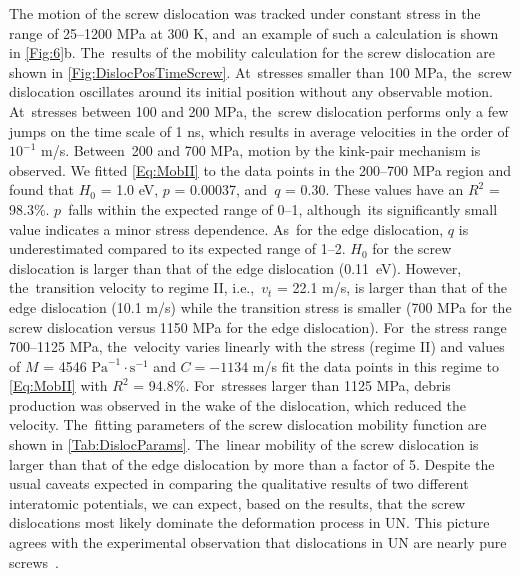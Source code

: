 \documentclass[applsci,article,accept,pdftex,moreauthors]{Definitions/mdpi}
\newcommand{\?}{\stackrel{?}{=}}
\begin{document}
The motion of the screw dislocation was tracked under constant stress in the range of 25--1200 MPa at 300 K, and~an example of such a calculation is shown in \cref{Fig:6}b. The~results of the mobility calculation for the screw dislocation are shown in \cref{Fig:DislocPosTimeScrew}. At~stresses smaller than 100 MPa, the~screw dislocation oscillates around its initial position without any observable motion. At~stresses between 100 and 200 MPa, the~screw dislocation performs only a few jumps on the time scale of 1 ns, which results in average velocities in the order of $10^{-1}$ m/s. Between~200 and 700 MPa, motion by the kink-pair mechanism is observed. We fitted \cref{Eq:MobII} to the data points in the 200--700 MPa region and found that $H_0$ = 1.0 eV, $p$ = 0.00037, and~$q$ = 0.30. These values have an $R^2$ = 98.3\%. $p$~falls within the expected range of 0--1, although~its significantly small value indicates a minor stress dependence. As~for the edge dislocation, $q$ is underestimated compared to its expected range of 1--2. $H_0$ for the screw dislocation is larger than that of the edge dislocation (0.11~eV). However, the~transition velocity to regime II, i.e.,~$v_t$ = 22.1 m/s, is larger than that of the edge dislocation (10.1 m/s) while the transition stress is smaller (700 MPa for the screw dislocation versus 1150 MPa for the edge dislocation). For~the stress range 700--1125 MPa, the~velocity varies linearly with the stress (regime II) and values of $M$ = 4546 $\mathrm{Pa}^{-1} \! \cdot \! \mathrm{s}^{-1}$ and $C = - 1134$ m/s fit the data points in this regime to \cref{Eq:MobII} with $R^2$ = 94.8\%. For~stresses larger than 1125 MPa, debris production was observed in the wake of the dislocation, which reduced the velocity. The~fitting parameters of the screw dislocation mobility function are shown in \cref{Tab:DislocParams}. The~linear mobility of the screw dislocation is larger than that of the edge dislocation by more than a factor of 5. Despite the usual caveats expected in comparing the qualitative results of two different interatomic potentials, we can expect, based on the results, that the screw dislocations most likely dominate the deformation process in UN. This picture agrees with the experimental observation that dislocations in UN are nearly pure screws~\cite{Sole1968}.
\end{document}
